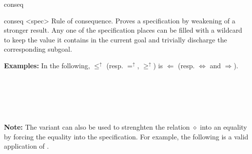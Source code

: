 \begin{tactic}{conseq}
  \begin{tsyntax}{conseq <spec>}
  Rule of consequence. Proves a specification by weakening of a
  stronger result. Any one of the specification places can be filled
  with a wildcard \tct{_} to keep the value it contains in the current
  goal and trivially discharge the corresponding subgoal.

  \textbf{Examples:} In the following, $\leq^\uparrow$ (resp. $=^\uparrow$,
  $\geq^\uparrow$) is $\Leftarrow$ (resp. $\Leftrightarrow$ and
  $\Rightarrow$).
  \begin{mathpar}
    {}%
    \quad{} \\
    {}%
    \quad{} \\
    {}%
    \quad{} \\
    {}%
    \quad{} \\
  \end{mathpar}

  \textbf{Note:} The \phl variant can also be used to strenghten the
  relation $\diamond$ into an equality by forcing the equality into
  the specification. For example, the following is a valid application
  of .
  \begin{mathpar}
    {}%
    \quad{} \\
  \end{mathpar}  
  \end{tsyntax}


\end{tactic}
